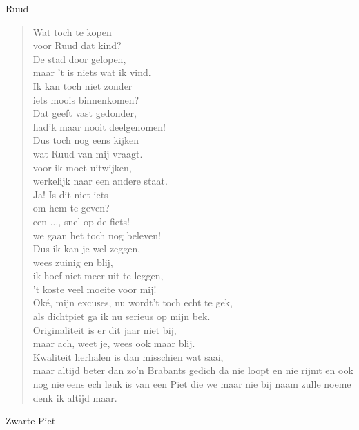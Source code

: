 \documentclass[12pt]{brief}
\date{4 december 2004}
\begin{document}
\begin{letter}{Ruud}

\opening{}


\begin{verse}

Wat toch te kopen\\
voor Ruud dat kind?\\
De stad door gelopen,\\
maar 't is niets wat ik vind.\\[0.5em]

Ik kan toch niet zonder\\
iets moois binnenkomen?\\
Dat geeft vast gedonder,\\
had'k maar nooit deelgenomen!\\[0.5em]

Dus toch nog eens kijken\\
wat Ruud van mij vraagt.\\
voor ik moet uitwijken,\\
werkelijk naar een andere staat.\\[0.5em]

Ja! Is dit niet iets\\
om hem te geven?\\
een ..., snel op de fiets!\\
we gaan het toch nog beleven!\\[0.5em]

Dus ik kan je wel zeggen,\\
wees zuinig en blij,\\
ik hoef niet meer uit te leggen,\\
't koste veel moeite voor mij!\\[2em]

Ok\'e, mijn excuses, nu wordt't toch echt te gek,\\
als dichtpiet ga ik nu serieus op mijn bek.\\
Originaliteit is er dit jaar niet bij,\\
maar ach, weet je, wees ook maar blij.\\
Kwaliteit herhalen is dan misschien wat saai,\\
maar altijd beter dan zo'n Brabants gedich da nie loopt en nie rijmt en ook nog nie eens ech leuk is van een Piet die we maar nie bij naam zulle noeme denk ik altijd maar.\\[1.2em]

\end{verse}


Zwarte Piet


\closing{}

\end{letter}
\end{document}
